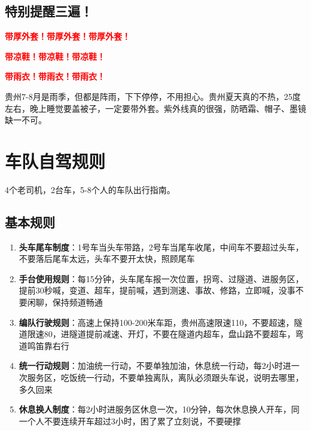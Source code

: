 \documentclass[12pt,a4paper,UTF8]{ctexart}
\begin{document}
\subsection{特别提醒三遍！}
\begin{center}
\Large \textcolor{red}{\textbf{带厚外套！带厚外套！带厚外套！}}
\end{center}
\vspace{0.3cm}
\begin{center}
\Large \textcolor{red}{\textbf{带凉鞋！带凉鞋！带凉鞋！}}
\end{center}
\vspace{0.3cm}
\begin{center}
\Large \textcolor{red}{\textbf{带雨衣！带雨衣！带雨衣！}}
\end{center}

贵州7-8月是雨季，但都是阵雨，下下停停，不用担心。贵州夏天真的不热，25度左右，晚上睡觉要盖被子，一定要带外套。紫外线真的很强，防晒霜、帽子、墨镜缺一不可。

\newpage

\section{车队自驾规则}

4个老司机，2台车，5-8个人的车队出行指南。

\subsection{基本规则}
\begin{enumerate}
\item \textbf{头车尾车制度}：1号车当头车带路，2号车当尾车收尾，中间车不要超过头车，不要落后尾车太远，头车不要开太快，照顾尾车
\item \textbf{手台使用规则}：每15分钟，头车尾车报一次位置，拐弯、过隧道、进服务区，提前30秒喊，变道、超车，提前喊，遇到测速、事故、修路，立即喊，没事不要闲聊，保持频道畅通
\item \textbf{编队行驶规则}：高速上保持100-200米车距，贵州高速限速110，不要超速，隧道限速80，进隧道提前减速、开灯，不要在隧道内超车，盘山路不要超车，弯道鸣笛靠右行
\item \textbf{统一行动规则}：加油统一行动，不要单独加油，休息统一行动，每2小时进一次服务区，吃饭统一行动，不要单独离队，离队必须跟头车说，说明去哪里，多久回来
\item \textbf{休息换人制度}：每2小时进服务区休息一次，10分钟，每次休息换人开车，同一个人不要连续开车超过3小时，困了累了立刻说，不要硬撑
\end{enumerate}
\end{document}
